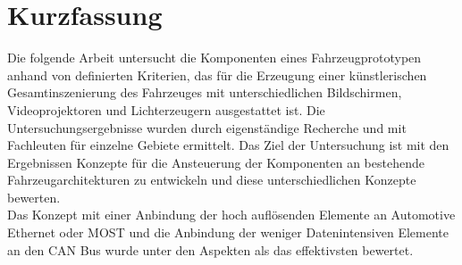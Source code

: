 \chapter*{Kurzfassung} %
Die folgende Arbeit untersucht die Komponenten eines Fahrzeugprototypen anhand von definierten Kriterien, das für die Erzeugung einer künstlerischen Gesamtinszenierung des Fahrzeuges mit unterschiedlichen Bildschirmen, Videoprojektoren und Lichterzeugern ausgestattet ist. Die Untersuchungsergebnisse wurden durch eigenständige Recherche und mit Fachleuten für einzelne Gebiete ermittelt. Das Ziel der Untersuchung ist mit den Ergebnissen Konzepte für die Ansteuerung der Komponenten an bestehende Fahrzeugarchitekturen zu entwickeln und diese unterschiedlichen Konzepte bewerten. \\
Das Konzept mit einer Anbindung der hoch auflösenden Elemente an Automotive Ethernet oder MOST und die Anbindung der weniger Datenintensiven Elemente an den CAN Bus wurde unter den Aspekten als das effektivsten bewertet.


\cleardoublepage